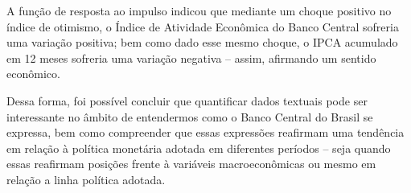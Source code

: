 A função de resposta ao impulso indicou que mediante um choque positivo no índice de otimismo, o Índice de Atividade Econômica do Banco Central sofreria uma variação positiva; bem como dado esse mesmo choque, o IPCA acumulado em 12 meses sofreria uma variação negativa -- assim, afirmando um sentido econômico.

Dessa forma, foi possível concluir que quantificar dados textuais pode ser interessante no âmbito de entendermos como o Banco Central do Brasil se expressa, bem como compreender que essas expressões reafirmam uma tendência em relação à política monetária adotada em diferentes períodos -- seja quando essas reafirmam posições frente à variáveis macroeconômicas ou mesmo em relação a linha política adotada.  